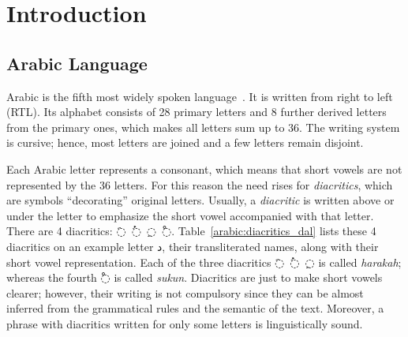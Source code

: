 \section{Introduction}\label{sec:introduction}
\subsection{Arabic Language}\label{sec:arabic-language}
\begin{table}[!t]
  \centering
  \caption{\textit{The 4 Diacritics of Arabic Language. Transliterated names (1st row), writing
      style on example letter \textarabic{د}} (2nd row), and corresponding short pronunciation
    vowel (3rd row).}\label{arabic:diacritics_dal}
\end{table}
Arabic is the fifth most widely spoken language~\cite{Simons201720thEditionEthnologue}.  It is
written from right to left (RTL). Its alphabet consists of 28 primary letters and 8 further derived
letters from the primary ones, which makes all letters sum up to 36.  The writing system is cursive;
hence, most letters are joined and a few letters remain disjoint.

Each Arabic letter represents a consonant, which means that short vowels are not represented by the
36 letters. For this reason the need rises for \textit{diacritics}, which are symbols ``decorating''
original letters. Usually, a \textit{diacritic} is written above or under the letter to emphasize the
short vowel accompanied with that letter. There are 4 diacritics: \mbox{\textarabic{◌َ} \textarabic{◌ُ}
  \textarabic{◌ِ} \textarabic{◌ْ}}. Table~\ref{arabic:diacritics_dal} lists these 4 diacritics on an
example letter \textarabic{د}, their transliterated names, along with their short vowel
representation. Each of the three diacritics \mbox{\textarabic{◌َ} \textarabic{◌ُ} \textarabic{◌ِ}} is called \textit{harakah}; whereas the fourth \textarabic{◌ْ} is called
\textit{sukun}. Diacritics are just to make short vowels clearer; however, their writing is not
compulsory since they can be almost inferred from the grammatical rules and the semantic of the
text. Moreover, a phrase with diacritics written for only some letters is linguistically sound.

